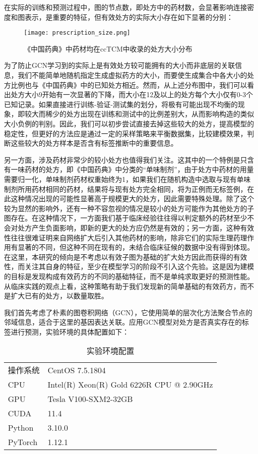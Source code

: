 在实际的训练和预测过程中，图的节点数，即处方中的药材数，会显著影响连接密度和图表示，是重要的特征，但有效处方的实际大小存在如下显著的分别：

\begin{figure}[H]
  \centering
  \texttt{[image: prescription\_size.png]}
  \caption{《中国药典》中药材均在ccTCM中收录的处方大小分布}
  \label{fig:prescription_size}
\end{figure}

为了防止GCN学习到的实际上是有效处方较可能拥有的大小而非底层的关联信息，我们不能简单地随机指定生成虚拟药方的大小，而要使生成集合中各大小的处方比例也与《中国药典》中的已知处方相近。然而，从上述分布图中，我们可以看出处方大小9开始有一次显著的下降，而大小在12及以上的处方每个大小仅有0-3个已知记录。如果直接进行训练-验证-测试集的划分，将极有可能出现不均衡的现象，即较大而稀少的处方出现在训练和测试中的比例差别大，从而影响构造的类似大小负例的判别。因此，我们可以初步尝试直接去掉这些较大的处方，提高模型的稳定性，但更好的方法应是通过一定的采样策略来平衡数据集，比较建模效果，判断这些较大的处方样本是否含有标签推断中的重要信息。

另一方面，涉及药材非常少的较小处方也值得我们关注。这其中的一个特例是只含有一味药材的处方，即《中国药典》中分类的“单味制剂”，由于处方中药材的用量需要归一化，单味制剂药材权重始终为1，如果我们在随机构造中选取与现有单味制剂所用药材相同的药材，结果将与现有处方完全相同，将为正例而无标签例，在此这种情况出现的可能性显著高于规模更大的处方，因此需要特殊处理。除了这个较为显然的影响外，还有一种不容忽视的情况是较小的处方可能作为其他处方的子图存在。在这种情况下，一方面我们基于临床经验往往得以判定额外的药材至少不会对处方产生负面影响，即新的更大的处方应仍然是有效的；另一方面，这种有效性往往很难证明来自网络扩大后引入其他药材的影响，除非它们的实际生理药理作用有显著的不同，但这种不同在现有的，未结合临床征候的数据中没有得到体现。在这里，本研究的倾向是不考虑以有效子图为基础的扩大处方因此而获得的有效性，而关注其自身的特征，至少在模型学习的阶段不引入这个先验。这是因为建模的目标是发现构成有效药方的不同的基础特征，而不是单纯求取更好的预测性能。从临床实践的观点上看，这种策略有助于我们发现新的简单基础的有效药方，而不是扩大已有的处方，以数量取胜。

我们首先考虑了朴素的图卷积网络（GCN），它使用简单的层次化方法聚合节点的邻域信息，适合于这里的基因表达关联。应用GCN模型对处方是否真实存在的标签进行预测，实验环境的具体配置如下：


\begin{table}
  \centering
  \caption{实验环境配置}
  \begin{tabular}{ll}
    \toprule
    操作系统 & CentOS 7.5.1804 \\
    CPU & Intel(R) Xeon(R) Gold 6226R CPU @ 2.90GHz \\
    GPU & Tesla V100-SXM2-32GB \\
    CUDA & 11.4 \\
    Python & 3.10.0 \\
    PyTorch & 1.12.1 \\
    \bottomrule
  \end{tabular}
  \label{tab:three-line}
\end{table}

